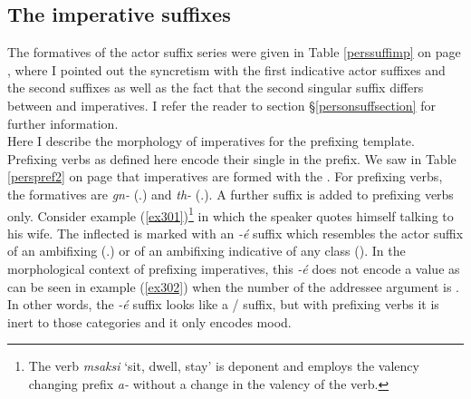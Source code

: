 \subsection{The imperative suffixes}\label{imperativesuffix}

The formatives of the  actor suffix series were given in Table \ref{perssuffimp} on page \pageref{perssuffimp}, where I pointed out the syncretism with the first  indicative actor suffixes and the second   suffixes as well as the fact that the second singular suffix differs between  and  imperatives. I refer the reader to section \S{}\ref{personsuffsection} for further information.\\

Here I describe the morphology of imperatives for the prefixing template. Prefixing verbs as defined here encode their single  in the prefix. We saw in Table \ref{perspref2} on page \pageref{perspref2} that imperatives are formed with the \Bet{} . For prefixing verbs, the formatives are \emph{gn-} (\Ssg.\Imp) and \emph{th-} (\Snsg.\Imp). A further suffix is added to prefixing verbs only. Consider example (\ref{ex301})\footnote{The verb \emph{msaksi} `sit, dwell, stay' is deponent and employs the valency changing prefix \emph{a-} without a change in the valency of the verb.} in which the speaker quotes himself talking to his wife. The  inflected  is marked with an \emph{-é} suffix which resembles the actor suffix of an ambifixing   (\Ssg.\Imp) or of an ambifixing indicative of any  class (\Fsg). In the morphological context of prefixing imperatives, this \emph{-é} does not encode a  value as can be seen in example (\ref{ex302}) when the number of the addressee argument is . In other words, the \emph{-é} suffix looks like a / suffix, but with prefixing verbs it is inert to those categories and it only encodes  mood.

